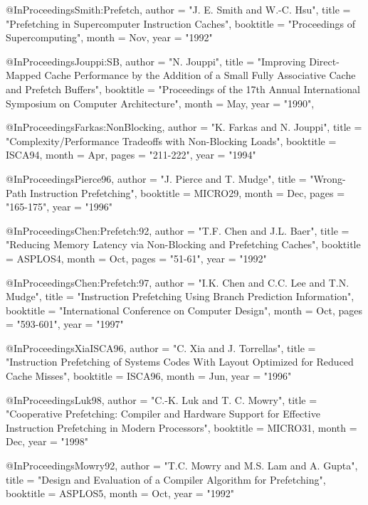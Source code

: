 @InProceedings{Smith:Prefetch,
  author =	"J. E. Smith and W.-C. Hsu",
  title =	"Prefetching in Supercomputer Instruction Caches",
  booktitle =    "Proceedings of Supercomputing",
  month =	Nov,
  year =         "1992"
}


@InProceedings{Jouppi:SB,
  author =       "N. Jouppi",
  title =        "Improving Direct-Mapped Cache Performance by the Addition of a Small Fully Associative Cache and Prefetch Buffers",
  booktitle =    "Proceedings of the 17th Annual International Symposium
                 on Computer Architecture",
  month =        May,
  year =         "1990",
}



@InProceedings{Farkas:NonBlocking,
  author =	"K. Farkas and N. Jouppi",
  title =	"Complexity/Performance Tradeoffs with Non-Blocking Loads",
  booktitle =    ISCA94,
  month =	Apr,
  pages =       "211-222",
  year =         "1994"
}


@InProceedings{Pierce96,
  author =	"J. Pierce and T. Mudge",
  title =	"Wrong-Path Instruction Prefetching",
  booktitle =    MICRO29,
  month =	Dec,
  pages =       "165-175",
  year =         "1996"
}



@InProceedings{Chen:Prefetch:92,
  author =	"T.F. Chen and J.L. Baer",
  title =	"Reducing Memory Latency via Non-Blocking and Prefetching Caches",
  booktitle =   ASPLOS4,
  month =	Oct,
  pages =       "51-61",
  year =         "1992"
}


@InProceedings{Chen:Prefetch:97,
  author =	"I.K. Chen and C.C. Lee and T.N. Mudge",
  title =	"Instruction Prefetching Using Branch Prediction Information",
  booktitle =   "International Conference on Computer Design",
  month =	Oct,
  pages =       "593-601",
  year =         "1997"
}



@InProceedings{XiaISCA96,
  author =	"C. Xia and J. Torrellas",
  title =	"Instruction Prefetching of Systems Codes With Layout Optimized for Reduced Cache Misses",
  booktitle =   ISCA96,
  month =	Jun,
  year =         "1996"
}


@InProceedings{Luk98,
  author =	"C.-K. Luk and T. C. Mowry",
  title =	"Cooperative Prefetching: Compiler and Hardware Support for Effective Instruction Prefetching in Modern Processors",
  booktitle =   MICRO31,
  month =	Dec,
  year =         "1998"
}


@InProceedings{Mowry92,
  author =	"T.C. Mowry and M.S. Lam and A. Gupta",
  title =	"Design and Evaluation of a Compiler Algorithm for Prefetching",
  booktitle =   ASPLOS5,
  month =	Oct,
  year =         "1992"
}


